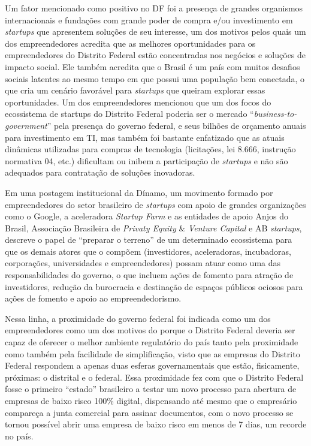 Um fator mencionado como positivo no DF foi a presença de grandes organismos internacionais e fundações com grande poder de compra e/ou investimento em \textit{startups} que apresentem soluções de seu interesse, um dos motivos pelos quais um dos empreendedores acredita que as melhores oportunidades para os empreendedores do Distrito Federal estão concentradas nos negócios e soluções de impacto social. Ele também acredita que o Brasil é um país com muitos desafios sociais latentes ao mesmo tempo em que possui uma população bem conectada, o que cria um cenário favorável para \textit{startups} que queiram explorar essas oportunidades. Um dos empreendedores mencionou que um dos focos do ecossistema de startups do Distrito Federal poderia ser o mercado ``\textit{business-to-government}'' pela presença do governo federal, e seus bilhões de orçamento anuais para investimento em TI, mas também foi bastante enfatizado que as atuais dinâmicas utilizadas para compras de tecnologia (licitações, lei 8.666, instrução normativa 04, etc.) dificultam ou inibem a participação de \textit{startups} e não são adequados para contratação de soluções inovadoras. 

Em uma postagem institucional da Dínamo, um movimento formado por empreendedores do setor brasileiro de \textit{startups} com apoio de grandes organizações como o Google, a aceleradora \textit{Startup Farm} e as entidades de apoio Anjos do Brasil, Associação Brasileira de \textit{Privaty Equity} \& \textit{Venture Capital} e AB \textit{startups},  descreve o papel de ``preparar o terreno'' de um determinado ecossistema para que os demais atores que o compõem (investidores, aceleradoras, incubadoras, corporações, universidades e empreendedores) possam atuar como uma das responsabilidades do governo, o que incluem ações de fomento para atração de investidores, redução da burocracia e destinação de espaços públicos ociosos para ações de fomento e apoio ao empreendedorismo.

Nessa linha, a proximidade do governo federal foi indicada como um dos empreendedores como um dos motivos do porque o Distrito Federal deveria ser capaz de oferecer o melhor ambiente regulatório do país tanto pela proximidade como também pela facilidade de simplificação, visto que as empresas do Distrito Federal respondem a apenas duas esferas governamentais que estão, fisicamente, próximas: o  distrital e o federal. Essa proximidade fez com que o Distrito Federal fosse o primeiro ``estado'' brasileiro a testar um novo processo para abertura de empresas de baixo risco 100\% digital, dispensando até mesmo que o empresário compareça a junta comercial para assinar documentos, com o novo processo se tornou possível abrir uma empresa de baixo risco em menos de 7 dias, um recorde no país.

